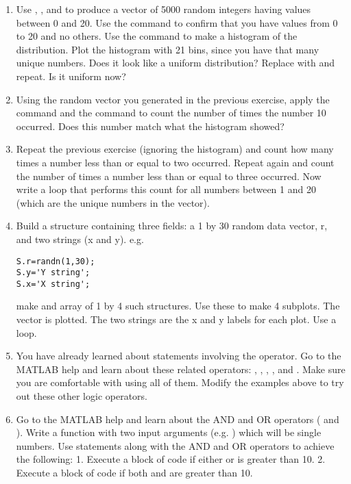 \documentclass{article}
\begin{document}
\begin{enumerate}

\item Use , , and \mcode{*} to produce a vector of 5000 random integers having values between 0 and 20.
Use the  command to confirm that you have values from 0 to 20 and no others. Use the  command to make a histogram of the distribution. Plot the histogram with 21 bins, since you have that many unique numbers. Does it look like a uniform distribution? Replace  with  and repeat. Is it uniform now?

\item Using the random vector you generated in the previous exercise, apply the  command and the  command to count the number of times the number 10 occurred. Does this number match what the histogram showed?

\item Repeat the previous exercise (ignoring the histogram) and count how many times a number less than or equal to two occurred. Repeat again and count the number of times a number less than or equal to three occurred. Now write a  loop that performs this count for all numbers between 1 and 20 (which are the unique numbers in the vector).

\item Build a structure containing three fields: a 1 by 30 random data vector, r, and two strings (x and y).  e.g.
\begin{lstlisting}
S.r=randn(1,30);
S.y='Y string';
S.x='X string';
\end{lstlisting}


make and array of 1 by 4 such structures. Use these to make 4 subplots. The vector is plotted. The two strings are the x and y labels for each plot. Use a loop.

\item You have already learned about  statements involving the \mcode{==} operator. Go to the MATLAB help and learn about these related operators: \mcode{<}, \mcode{>}, \mcode{!=}, \mcode{>=}, and \mcode{<=}. Make sure you are comfortable with using all of them. Modify the  examples above to try out these other logic operators.

\item Go to the MATLAB help and learn about the AND and OR operators (\mcode{&} and \mcode{\|}). Write a function with two input arguments (e.g. ) which will be single numbers. Use  statements along with the AND and OR operators to achieve the following: 1. Execute a block of code if either  or  is greater than 10.  2. Execute a block of code if both  and  are greater than 10.


\end{enumerate}
\end{document}
